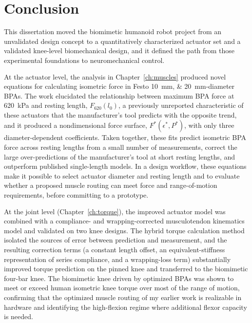 \chapter{Conclusion}\label{ch:conclusion}
\graphicspath{{D:/Github/Bipedal_Robot/Documentation/Reports and Papers/Dissertation/Figures/80-conclusion/}{figs/80-conclusion/}}

This dissertation moved the biomimetic humanoid robot project from an unvalidated design concept to a quantitatively characterized actuator set and a validated knee-level biomechanical design, and it defined the path from those experimental foundations to neuromechanical control.

At the actuator level, the analysis in Chapter~\ref{ch:muscles} produced novel equations for calculating isometric force in Festo \qtylist{10;20}{\mm}-diameter BPAs. The work elucidated the relationship between maximum BPA force at \qty{620}{\kPa} and resting length, $F_{620}(l_0)$, a previously unreported characteristic of these actuators that the manufacturer's tool predicts with the opposite trend, and it produced a nondimensional force surface, $F^*(\epsilon^*,P^*)$, with only three diameter-dependent coefficients. Taken together, these fits predict isometric BPA force across resting lengths from a small number of measurements, correct the large over-predictions of the manufacturer's tool at short resting lengths, and outperform published single-length models. In a design workflow, these equations make it possible to select actuator diameter and resting length and to evaluate whether a proposed muscle routing can meet force and range-of-motion requirements, before committing to a prototype.

At the joint level (Chapter~\ref{ch:torque}), the improved actuator model was combined with a compliance- and wrapping-corrected musculotendon kinematics model and validated on two knee designs. The hybrid torque calculation method isolated the sources of error between prediction and measurement, and the resulting correction terms (a constant length offset, an equivalent-stiffness representation of series compliance, and a wrapping-loss term) substantially improved torque prediction on the pinned knee and transferred to the biomimetic four-bar knee. The biomimetic knee driven by optimized BPAs was shown to meet or exceed human isometric knee torque over most of the range of motion, confirming that the optimized muscle routing of my earlier work is realizable in hardware and identifying the high-flexion regime where additional flexor capacity is needed.

